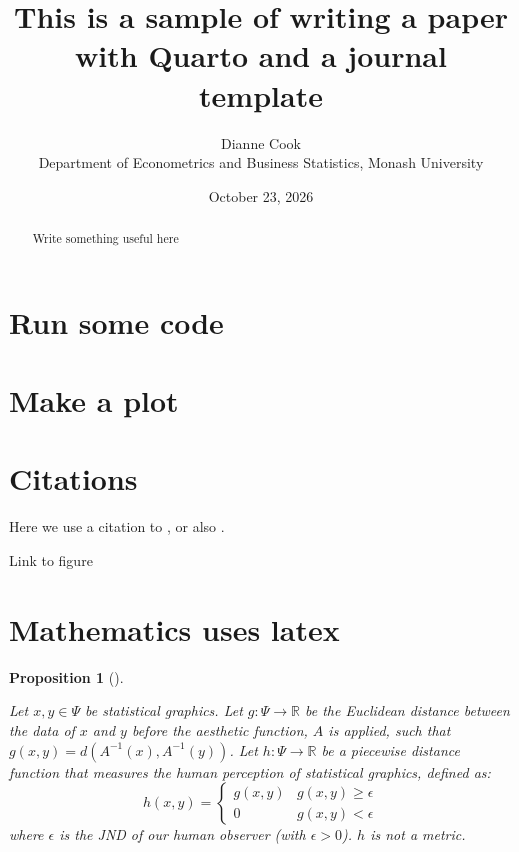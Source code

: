 \documentclass[
  12pt]{article}
\theoremstyle{plain}
\newtheorem{proposition}{Proposition}[section]
\theoremstyle{remark}
\begin{document}
\def\spacingset#1{\renewcommand{\baselinestretch}%
{#1}\small\normalsize} \spacingset{1}



\date{October 23, 2026}
\title{\bf This is a sample of writing a paper with Quarto and a journal
template}
\author{
Dianne Cook\\
Department of Econometrics and Business Statistics, Monash University\\
}
\maketitle

\bigskip
\bigskip
\begin{abstract}
Write something useful here
\end{abstract}


\newpage
\spacingset{1.9} %


\section{Run some code}\label{run-some-code}

\section{Make a plot}\label{make-a-plot}

\section{Citations}\label{citations}

Here we use a citation to \citet{Patrick2023}, or also
\citep{Patrick2023}.

Link to figure

\section{Mathematics uses latex}\label{mathematics-uses-latex}

\begin{proposition}[]\protect\hypertarget{prp-metric}{}\label{prp-metric}

Let \(x,y \in \Psi\) be statistical graphics. Let
\(g: \Psi \xrightarrow{} \mathbb{R}\) be the Euclidean distance between
the data of \(x\) and \(y\) before the aesthetic function, \(A\) is
applied, such that \(g(x,y) = d(A^{-1}(x), A^{-1}(y))\). Let
\(h: \Psi \xrightarrow{} \mathbb{R}\) be a piecewise distance function
that measures the human perception of statistical graphics, defined as:
\[
h(x, y) = \begin{cases} 
      g(x,y) & g(x,y) \geq \epsilon \\
      0 &  g(x,y) < \epsilon
   \end{cases}
\] where \(\epsilon\) is the JND of our human observer (with
\(\epsilon>0\)). \(h\) is not a metric.

\end{proposition}
\end{document}
